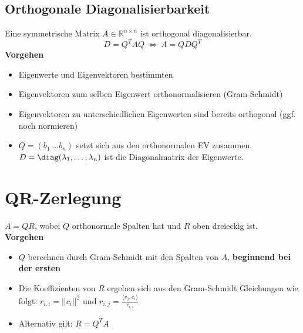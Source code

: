 \documentclass[german, 6pt]{latex4ei/latex4ei_sheet}
\begin{document}
\subsection{Orthogonale Diagonalisierbarkeit}
Eine symmetrische Matrix $A \in \mathbb{R}^{n \times n}$ ist orthogonal diagonalisierbar.
\begin{equation*}
D=Q^{T}AQ \ \Leftrightarrow \ A=QDQ^{T}
\end{equation*}
\textbf{Vorgehen}
\begin{itemize}
\item Eigenwerte und Eigenvektoren bestimmten
\item Eigenvektoren zum selben Eigenwert orthonormalisieren (Gram-Schmidt)
\item Eigenvektoren zu unterschiedlichen Eigenwerten sind bereits orthogonal (ggf. noch normieren)
\item $Q=(b_1 \ \dots b_n)$ setzt sich aus den orthonormalen EV zusammen. \\
$D=\diag(\lambda_1,\dots,\lambda_n)$ ist die Diagonalmatrix der Eigenwerte.
\end{itemize}

\section{QR-Zerlegung}
$A = QR$, wobei $Q$ orthonormale Spalten hat und $R$ oben dreieckig ist.\\
\textbf{Vorgehen}
\begin{itemize}\itemsep0pt
 \item $Q$ berechnen durch Gram-Schmidt mit den Spalten von $A$, \textbf{beginnend bei der ersten}
 \item Die Koeffizienten von $R$ ergeben sich aus den Gram-Schmidt Gleichungen wie folgt: $r_{i,i}=||c_i||^2$ und $r_{i,j}=\frac{\langle v_j,c_i \rangle}{r_{i,i}}$
 \item Alternativ gilt: $R = Q^TA$
\end{itemize}
\end{document}
